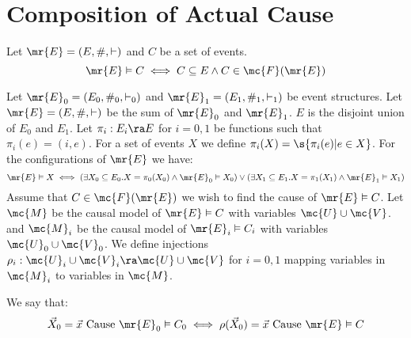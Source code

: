 \section{Composition of Actual Cause}
Let $\mr{E} = (E,\#,\vdash)$ and $C$ be a set of events.
\begin{equation*}
    \mr{E} \vDash C \iff C \subseteq E \wedge  C \in \mc{F}(\mr{E})
\end{equation*}


Let $\mr{E}_0 = (E_0,\#_0,\vdash_0)$ and
$\mr{E}_1 = (E_1,\#_1,\vdash_1)$ be event structures.
Let $\mr{E} = (E,\#,\vdash)$ be the sum of $\mr{E}_0$ and $\mr{E}_1$.
$E$ is the disjoint union of $E_0$ and $E_1$.
Let $\pi_i: E_i \ra E$ for $i = 0,1$ be functions such that
$\pi_i(e) = (i,e)$.
For a set of events $X$ we define $\pi_i(X) = \s{\pi_i(e)| e\in X}$.
For the configurations of $\mr{E}$ we have:
\begin{equation*}
    \mr{E} \vDash X \iff
    (\exists X_0 \subseteq E_0. X = \pi_0(X_0)
    \wedge  \mr{E}_0 \vDash X_0 )
    \vee
    (\exists X_1 \subseteq E_1. X = \pi_1(X_1)
    \wedge  \mr{E}_1 \vDash X_1 )
\end{equation*}
Assume that $C \in \mc{F}(\mr{E})$ we wish to find the cause of
$\mr{E} \vDash C$.
Let $\mc{M}$ be the causal model of $\mr{E} \vDash C$ with
variables $\mc{U} \cup \mc{V}$.
and $\mc{M}_i$ be the causal model of $\mr{E}_i \vDash C_i$ with 
variables $\mc{U}_0 \cup \mc{V}_0$.
We define injections
$\rho_i: \mc{U}_i \cup \mc{V}_i \ra \mc{U} \cup \mc{V}$ for 
$i = 0,1$ mapping variables in $\mc{M}_i$ to variables in $\mc{M}$.

We say that:
\begin{equation*}
    \vec X_0 = \vec x \text{ Cause } \mr{E}_0 \vDash C_0
    \iff
    \rho(\vec X_0) = \vec x \text{ Cause } \mr{E} \vDash C
\end{equation*}
